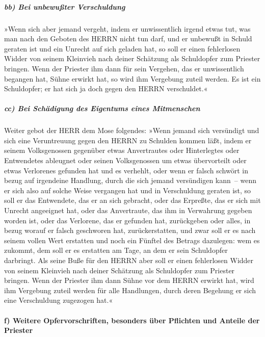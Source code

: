 \hypertarget{bb-bei-unbewuuxdfter-verschuldung}{%
\subparagraph{bb) Bei unbewußter
Verschuldung}\label{bb-bei-unbewuuxdfter-verschuldung}}

»Wenn sich aber jemand vergeht, indem er unwissentlich
irgend etwas tut, was man nach den Geboten des HERRN nicht tun darf, und
er unbewußt in Schuld geraten ist und ein Unrecht auf sich geladen hat,
so soll er einen fehlerlosen Widder von seinem Kleinvieh
nach deiner Schätzung als Schuldopfer zum Priester bringen. Wenn der
Priester ihm dann für sein Vergehen, das er unwissentlich begangen hat,
Sühne erwirkt hat, so wird ihm Vergebung zuteil werden.
Es ist ein Schuldopfer; er hat sich ja doch gegen den
HERRN verschuldet.«

\hypertarget{cc-bei-schuxe4digung-des-eigentums-eines-mitmenschen}{%
\subparagraph{cc) Bei Schädigung des Eigentums eines
Mitmenschen}\label{cc-bei-schuxe4digung-des-eigentums-eines-mitmenschen}}

Weiter gebot der HERR dem Mose folgendes:
»Wenn jemand sich versündigt und sich eine Veruntreuung
gegen den HERRN zu Schulden kommen läßt, indem er seinem Volksgenossen
gegenüber etwas Anvertrautes oder Hinterlegtes oder Entwendetes
ableugnet oder seinen Volksgenossen um etwas übervorteilt
oder etwas Verlorenes gefunden hat und es verhehlt, oder
wenn er falsch schwört in bezug auf irgendeine Handlung, durch die sich
jemand versündigen kann~-- wenn er sich also auf solche
Weise vergangen hat und in Verschuldung geraten ist, so soll er das
Entwendete, das er an sich gebracht, oder das Erpreßte, das er sich mit
Unrecht angeeignet hat, oder das Anvertraute, das ihm in Verwahrung
gegeben worden ist, oder das Verlorene, das er gefunden hat, zurückgeben
oder alles, in bezug worauf er falsch geschworen hat,
zurückerstatten, und zwar soll er es nach seinem vollen Wert erstatten
und noch ein Fünftel des Betrags dazulegen: wem es zukommt, dem soll er
es erstatten am Tage, an dem er sein Schuldopfer darbringt.
Als seine Buße für den HERRN aber soll er einen
fehlerlosen Widder von seinem Kleinvieh nach deiner Schätzung als
Schuldopfer zum Priester bringen. Wenn der Priester ihm
dann Sühne vor dem HERRN erwirkt hat, wird ihm Vergebung zuteil werden
für alle Handlungen, durch deren Begehung er sich eine Verschuldung
zugezogen hat.«

\hypertarget{f-weitere-opfervorschriften-besonders-uxfcber-pflichten-und-anteile-der-priester}{%
\paragraph{f) Weitere Opfervorschriften, besonders über Pflichten und
Anteile der
Priester}\label{f-weitere-opfervorschriften-besonders-uxfcber-pflichten-und-anteile-der-priester}}

